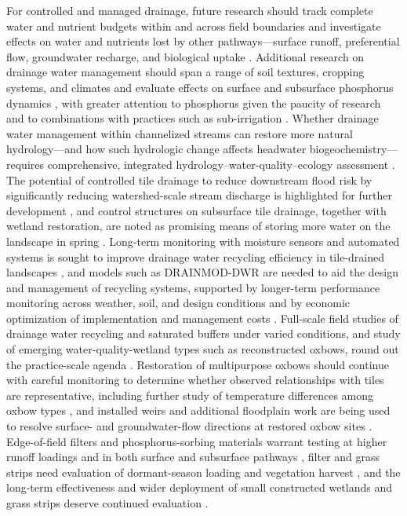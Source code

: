 \documentclass[11pt]{article}
\begin{document}
For controlled and managed drainage, future research should track complete water and nutrient budgets within and across field boundaries \parencite{Shedekar2021} and investigate effects on water and nutrients lost by other pathways---surface runoff, preferential flow, groundwater recharge, and biological uptake \parencite{Ross2016}. Additional research on drainage water management should span a range of soil textures, cropping systems, and climates and evaluate effects on surface and subsurface phosphorus dynamics \parencite{King2022}, with greater attention to phosphorus given the paucity of research and to combinations with practices such as sub-irrigation \parencite{Ross2016}. Whether drainage water management within channelized streams can restore more natural hydrology---and how such hydrologic change affects headwater biogeochemistry---requires comprehensive, integrated hydrology--water-quality--ecology assessment \parencite{King2009}. The potential of controlled tile drainage to reduce downstream flood risk by significantly reducing watershed-scale stream discharge is highlighted for further development \parencite{Sunohara2015}, and control structures on subsurface tile drainage, together with wetland restoration, are noted as promising means of storing more water on the landscape in spring \parencite{Dalzell2018}. Long-term monitoring with moisture sensors and automated systems is sought to improve drainage water recycling efficiency in tile-drained landscapes \parencite{Kaur2021}, and models such as DRAINMOD-DWR are needed to aid the design and management of recycling systems, supported by longer-term performance monitoring across weather, soil, and design conditions and by economic optimization of implementation and management costs \parencite{Moursi2024}. Full-scale field studies of drainage water recycling and saturated buffers under varied conditions, and study of emerging water-quality-wetland types such as reconstructed oxbows, round out the practice-scale agenda \parencite{Mitchell2023}. Restoration of multipurpose oxbows should continue with careful monitoring to determine whether observed relationships with tiles are representative, including further study of temperature differences among oxbow types \parencite{Leberg2024}, and installed weirs and additional floodplain work are being used to resolve surface- and groundwater-flow directions at restored oxbow sites \parencite{Schilling2017}. Edge-of-field filters and phosphorus-sorbing materials warrant testing at higher runoff loadings and in both surface and subsurface pathways \parencite{Plach2023}, filter and grass strips need evaluation of dormant-season loading and vegetation harvest \parencite{Holly2016,Vallée2015}, and the long-term effectiveness and wider deployment of small constructed wetlands and grass strips deserve continued evaluation \parencite{Vallée2015}.
\end{document}
